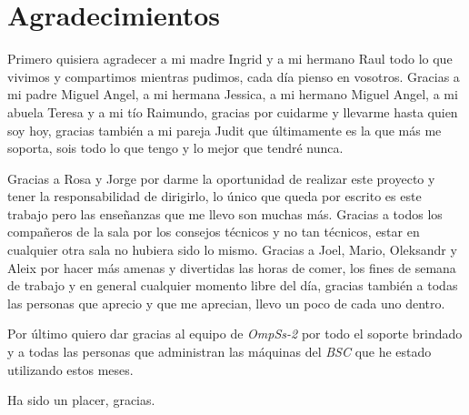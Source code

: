 \section*{Agradecimientos}


Primero quisiera agradecer a mi madre Ingrid y a mi hermano Raul todo lo que vivimos y compartimos mientras pudimos, cada día pienso en vosotros. Gracias a mi padre Miguel Angel, a mi hermana Jessica, a mi hermano Miguel Angel, a mi abuela Teresa y a mi tío Raimundo, gracias por cuidarme y llevarme hasta quien soy hoy, gracias también a mi pareja Judit que últimamente es la que más me soporta, sois todo lo que tengo y lo mejor que tendré nunca.
\par\bigskip
Gracias a Rosa y Jorge por darme la oportunidad de realizar este proyecto y tener la responsabilidad de dirigirlo, lo único que queda por escrito es este trabajo pero las enseñanzas que me llevo son muchas más. Gracias a todos los compañeros de la sala por los consejos técnicos y no tan técnicos, estar en cualquier otra sala no hubiera sido lo mismo. Gracias a Joel, Mario, Oleksandr y Aleix por hacer más amenas y divertidas las horas de comer, los fines de semana de trabajo y en general cualquier momento libre del día, gracias también a todas las personas que aprecio y que me aprecian, llevo un poco de cada uno dentro.
\par\bigskip
Por último quiero dar gracias al equipo de \textit{OmpSs-2} por todo el soporte brindado y a todas las personas que administran las máquinas del \textit{BSC} que he estado utilizando estos meses. 
\par \bigskip
Ha sido un placer, gracias.

